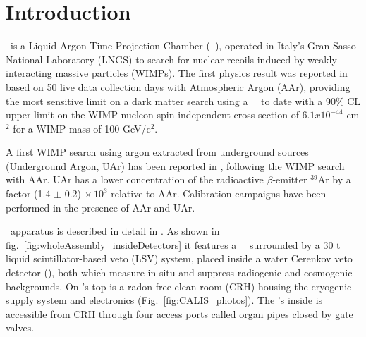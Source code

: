 \section{Introduction}\label{sec:intro}\label{sec:introduction}


\dsf\ is a Liquid Argon Time Projection Chamber (\lar\ \tpc), operated in Italy's Gran Sasso National Laboratory (LNGS) to search for nuclear recoils induced by weakly interacting massive particles (WIMPs). The first physics result was reported in \cite{Agnes:2015gu} based on 50 live data collection days with Atmospheric Argon (AAr), providing the most sensitive limit on a dark matter search using a \lar\ \tpc\ to date with a 90\% CL upper limit on the WIMP-nucleon spin-independent cross section of $6.1 x 10^{-44}$ cm$^2$ for a WIMP mass of 100 GeV/c$^2$.  %

A first WIMP search using argon extracted from underground sources (Underground Argon, UAr) has been reported in \cite{Agnes:2015_uar}, following the WIMP search with AAr. UAr has a lower concentration of the radioactive $\beta$-emitter $^{39}$Ar by a factor (1.4 $\pm$ 0.2) $\times\, 10^3$ relative to AAr. Calibration campaigns have been performed in the presence of AAr and UAr.

\dsf\ apparatus is described in detail in \cite{Agnes:2015gu}. As shown in fig.~\ref{fig:wholeAssembly_insideDetectors} it features a \lar\ \tpc\ surrounded by a 30 t liquid scintillator-based veto (LSV) system, placed inside a water Cerenkov veto detector (\wcv), both which measure in-situ and suppress radiogenic and cosmogenic backgrounds. On \wcv's top is a radon-free clean room (CRH) housing the cryogenic supply system and electronics (Fig.~\ref{fig:CALIS_photos}). The \lsv's inside is accessible from CRH through four access ports called organ pipes closed by gate valves. 


